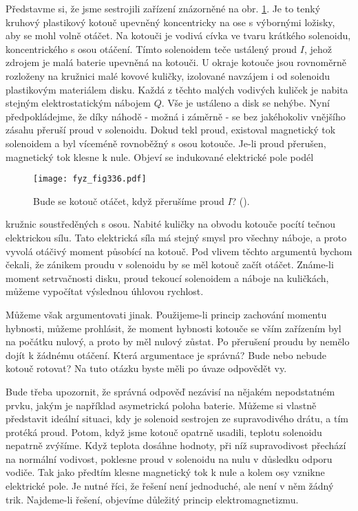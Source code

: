   Představme si, že jsme sestrojili zařízení znázorněné na obr. \ref{fyz:fig336}. Je to tenký 
  kruhový plastikový kotouč upevněný koncentricky na ose s výbornými ložisky, aby se mohl volně 
  otáčet. Na kotouči je vodivá cívka ve tvaru krátkého solenoidu, koncentrického s osou otáčení. 
  Tímto solenoidem teče ustálený proud \(I\), jehož zdrojem je malá baterie upevněná na kotouči. U 
  okraje kotouče jsou rovnoměrně rozloženy na kružnici malé kovové kuličky, izolované navzájem i od 
  solenoidu plastikovým materiálem disku. Každá z těchto malých vodivých kuliček je nabita stejným 
  elektrostatickým nábojem \(Q\). Vše je ustáleno a disk se nehýbe. Nyní předpokládejme, že díky 
  náhodě - možná i záměrně - se bez jakéhokoliv vnějšího zásahu přeruší proud v solenoidu. Dokud 
  tekl proud, existoval magnetický tok solenoidem a byl víceméně rovnoběžný s osou kotouče. Je-li 
  proud přerušen, magnetický tok klesne k nule. Objeví se indukované elektrické pole podél
  \begin{figure}[ht!]  %
    \centering
    \texttt{[image: fyz\_fig336.pdf]}
    \caption{Bude se kotouč otáčet, když přerušíme proud \(I\)?
             (\cite[s.~300]{Feynman02}).}
    \label{fyz:fig336}
  \end{figure}
  kružnic soustředěných s osou. Nabité kuličky na obvodu kotouče pocítí tečnou elektrickou sílu. 
  Tato elektrická síla má stejný smysl pro všechny náboje, a proto vyvolá otáčivý moment působící 
  na kotouč. Pod vlivem těchto argumentů bychom čekali, že zánikem proudu v solenoidu by se měl 
  kotouč začít otáčet. Známe-li moment setrvačnosti disku, proud tekoucí solenoidem a náboje
  na kuličkách, můžeme vypočítat výslednou úhlovou rychlost.
  
  Můžeme však argumentovati jinak. Použijeme-li princip zachování momentu hybnosti, můžeme 
  prohlásit, že moment hybnosti kotouče se vším zařízením byl na počátku nulový, a proto by měl 
  nulový zůstat. Po přerušení proudu by nemělo dojít k žádnému otáčení. Která argumentace je 
  správná? Bude nebo nebude kotouč rotovat? Na tuto otázku byste měli po úvaze odpovědět vy.
  
  Bude třeba upozornit, že správná odpověď nezávisí na nějakém nepodstatném prvku, jakým je 
  například asymetrická poloha baterie. Můžeme si vlastně představit ideální situaci, kdy je 
  solenoid sestrojen ze supravodivého drátu, a tím protéká proud. Potom, když jsme kotouč opatrně 
  usadili, teplotu solenoidu nepatrně zvýšíme. Když teplota dosáhne hodnoty, při níž supravodivost 
  přechází na normální vodivost, poklesne proud v solenoidu na nulu v důsledku odporu vodiče. Tak 
  jako předtím klesne magnetický tok k nule a kolem osy vznikne elektrické pole. Je nutné říci, že 
  řešení není jednoduché, ale není v něm žádný trik. Najdeme-li řešení, objevíme důležitý princip 
  elektromagnetizmu.
  
